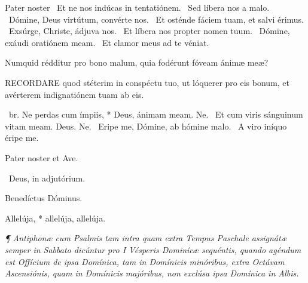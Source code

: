 Pater noster  \V\ Et ne nos indúcas in tentatiónem. \R\ Sed líbera nos a malo. \V\ Dómine, Deus virtútum, convérte nos. \R\ Et osténde fáciem tuam, et salvi érimus. \V\ Exsúrge, Christe, ádjuva nos. \R\ Et líbera nos propter nomen tuum. \V\ Dómine, exáudi oratiónem meam. \R\ Et clamor meus ad te véniat.




 Numquid rédditur pro bono malum, quia fodérunt fóveam ánimæ meæ?


\lettrine[lines=2]{R}{ECORDARE} quod stéterim in conspéctu tuo, ut lóquerer pro eis bonum, et avérterem indignatiónem tuam ab eis.

\R\ br. Ne perdas cum ímpiis, * Deus, ánimam meam. Ne. \V\ Et cum viris sánguinum vitam meam. Deus. Ne. \V\ Eripe me, Dómine, ab hómine malo. \R\ A viro iníquo éripe me.



\sectionornament



Pater noster et Ave.

\V\ Deus, in adjutórium.


 Benedíctus Dóminus. \textdagger


 Allelúja, * allelúja, allelúja.

\textit{¶ Antiphonæ cum Psalmis tam intra quam extra Tempus Paschale assignátæ semper in Sabbato dicúntur pro I Vésperis Dominícæ sequéntis, quando agéndum est Offícium de ipsa Domínica, tam in Domínicis minóribus, extra Octávam Ascensiónis, quam in Domínicis majóribus, non exclúsa ipsa Domínica in Albis.}

